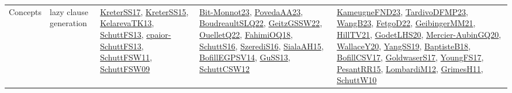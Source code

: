 {\begin{longtable}{lp{3cm}>{\raggedright}p{6cm}>{\raggedright}p{6cm}p{8cm}}
Concepts & lazy clause generation & \href{articles/KreterSS17.pdf}{KreterSS17}\cite{KreterSS17}, \href{papers/KreterSS15.pdf}{KreterSS15}\cite{KreterSS15}, \href{papers/KelarevaTK13.pdf}{KelarevaTK13}\cite{KelarevaTK13}, \href{papers/SchuttFS13.pdf}{SchuttFS13}\cite{SchuttFS13}, \href{papers/cpaior-SchuttFS13.pdf}{cpaior-SchuttFS13}\cite{cpaior-SchuttFS13}, \href{articles/SchuttFSW11.pdf}{SchuttFSW11}\cite{SchuttFSW11}, \href{papers/SchuttFSW09.pdf}{SchuttFSW09}\cite{SchuttFSW09} & \href{papers/Bit-Monnot23.pdf}{Bit-Monnot23}\cite{Bit-Monnot23}, \href{papers/PovedaAA23.pdf}{PovedaAA23}\cite{PovedaAA23}, \href{papers/BoudreaultSLQ22.pdf}{BoudreaultSLQ22}\cite{BoudreaultSLQ22}, \href{papers/GeitzGSSW22.pdf}{GeitzGSSW22}\cite{GeitzGSSW22}, \href{papers/OuelletQ22.pdf}{OuelletQ22}\cite{OuelletQ22}, \href{articles/FahimiOQ18.pdf}{FahimiOQ18}\cite{FahimiOQ18}, \href{papers/SchuttS16.pdf}{SchuttS16}\cite{SchuttS16}, \href{papers/SzerediS16.pdf}{SzerediS16}\cite{SzerediS16}, \href{papers/SialaAH15.pdf}{SialaAH15}\cite{SialaAH15}, \href{papers/BofillEGPSV14.pdf}{BofillEGPSV14}\cite{BofillEGPSV14}, \href{papers/GuSS13.pdf}{GuSS13}\cite{GuSS13}, \href{papers/SchuttCSW12.pdf}{SchuttCSW12}\cite{SchuttCSW12} & \href{papers/KameugneFND23.pdf}{KameugneFND23}\cite{KameugneFND23}, \href{papers/TardivoDFMP23.pdf}{TardivoDFMP23}\cite{TardivoDFMP23}, \href{papers/WangB23.pdf}{WangB23}\cite{WangB23}, \href{articles/FetgoD22.pdf}{FetgoD22}\cite{FetgoD22}, \href{papers/GeibingerMM21.pdf}{GeibingerMM21}\cite{GeibingerMM21}, \href{papers/HillTV21.pdf}{HillTV21}\cite{HillTV21}, \href{papers/GodetLHS20.pdf}{GodetLHS20}\cite{GodetLHS20}, \href{papers/Mercier-AubinGQ20.pdf}{Mercier-AubinGQ20}\cite{Mercier-AubinGQ20}, \href{articles/WallaceY20.pdf}{WallaceY20}\cite{WallaceY20}, \href{papers/YangSS19.pdf}{YangSS19}\cite{YangSS19}, \href{articles/BaptisteB18.pdf}{BaptisteB18}\cite{BaptisteB18}, \href{papers/BofillCSV17.pdf}{BofillCSV17}\cite{BofillCSV17}, \href{papers/GoldwaserS17.pdf}{GoldwaserS17}\cite{GoldwaserS17}, \href{papers/YoungFS17.pdf}{YoungFS17}\cite{YoungFS17}, \href{papers/PesantRR15.pdf}{PesantRR15}\cite{PesantRR15}, \href{articles/LombardiM12.pdf}{LombardiM12}\cite{LombardiM12}, \href{papers/GrimesH11.pdf}{GrimesH11}\cite{GrimesH11}, \href{papers/SchuttW10.pdf}{SchuttW10}\cite{SchuttW10}\\

\end{longtable}}
